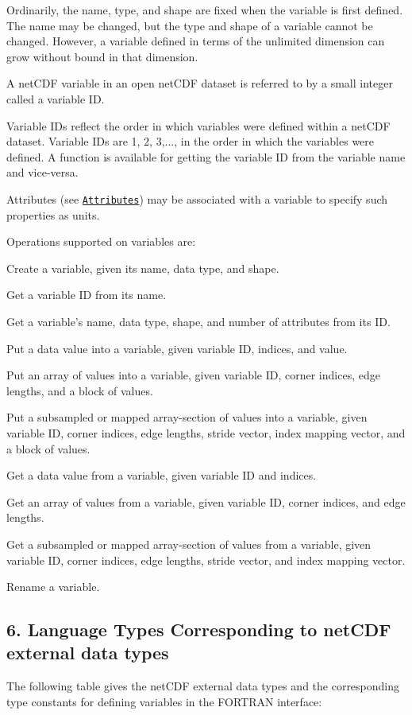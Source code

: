 Ordinarily, the name, type, and shape are fixed when the variable is first defined. The name may be changed, but the type and shape of a variable cannot be changed. However, a variable defined in terms of the unlimited dimension can grow without bound in that dimension.

A net\+C\+DF variable in an open net\+C\+DF dataset is referred to by a small integer called a variable ID.

Variable I\+Ds reflect the order in which variables were defined within a net\+C\+DF dataset. Variable I\+Ds are 1, 2, 3,..., in the order in which the variables were defined. A function is available for getting the variable ID from the variable name and vice-\/versa.

Attributes (see \href{#Attributes}{\tt Attributes}) may be associated with a variable to specify such properties as units.

Operations supported on variables are\+:


\begin{DoxyItemize}
\item Create a variable, given its name, data type, and shape.
\item Get a variable ID from its name.
\item Get a variable’s name, data type, shape, and number of attributes from its ID.
\item Put a data value into a variable, given variable ID, indices, and value.
\item Put an array of values into a variable, given variable ID, corner indices, edge lengths, and a block of values.
\item Put a subsampled or mapped array-\/section of values into a variable, given variable ID, corner indices, edge lengths, stride vector, index mapping vector, and a block of values.
\item Get a data value from a variable, given variable ID and indices.
\item Get an array of values from a variable, given variable ID, corner indices, and edge lengths.
\item Get a subsampled or mapped array-\/section of values from a variable, given variable ID, corner indices, edge lengths, stride vector, and index mapping vector.
\item Rename a variable.
\end{DoxyItemize}\hypertarget{f90-variables_f90-language-types-corresponding-to-netcdf-external-data-types}{}\subsection{6. Language Types Corresponding to net\+C\+D\+F external data types }\label{f90-variables_f90-language-types-corresponding-to-netcdf-external-data-types}
The following table gives the net\+C\+DF external data types and the corresponding type constants for defining variables in the F\+O\+R\+T\+R\+AN interface\+:

